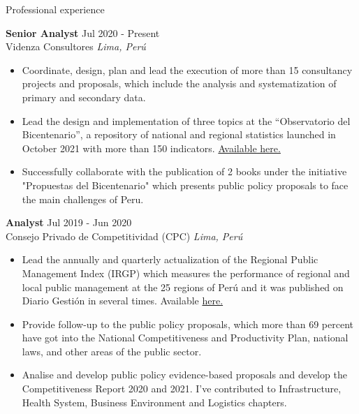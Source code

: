 \documentclass{resume} %
\begin{document}
\begin{rSection}{Professional experience}

\textbf{Senior Analyst} \hfill Jul 2020 - Present \\
Videnza Consultores \hfill \textit{Lima, Perú}
 \begin{itemize}
    \itemsep -3pt {} 
      \item Coordinate, design, plan and lead the execution of more than 15 consultancy projects and proposals, which include the analysis and systematization of primary and secondary data.
      \item Lead the design and implementation of three topics at the “Observatorio del Bicentenario”, a repository of national and regional statistics launched in October 2021 with more than 150 indicators. \href{https://propuestasdelbicentenario.pe/observatorio/}{Available here.}
      \item Successfully collaborate with the publication of 2 books under the initiative "Propuestas del Bicentenario" which presents public policy proposals to face the main challenges of Peru.
   \end{itemize}
 
 \textbf{Analyst} \hfill Jul 2019 - Jun 2020\\
Consejo Privado de Competitividad (CPC) \hfill \textit{Lima, Perú}
 \begin{itemize}
    \itemsep -3pt {} 
      \item Lead the annually and quarterly actualization of the Regional Public Management Index (IRGP) which measures the performance of regional and local public management at the 25 regions of Perú and it was published on Diario Gestión in several times. Available \href{https://www.compite.pe/wp-content/uploads/2020/07/IRGP-2020-version-final.pdf}{here.}
      \item Provide follow-up to the public policy proposals, which more than 69 percent have got into the National Competitiveness and Productivity Plan, national laws, and other areas of the public sector.
      \item Analise and develop public policy evidence-based proposals and develop the Competitiveness Report 2020 and 2021. I’ve contributed to Infrastructure, Health System, Business Environment and Logistics chapters. 
 \end{itemize}
\end{rSection} 
\end{document}
